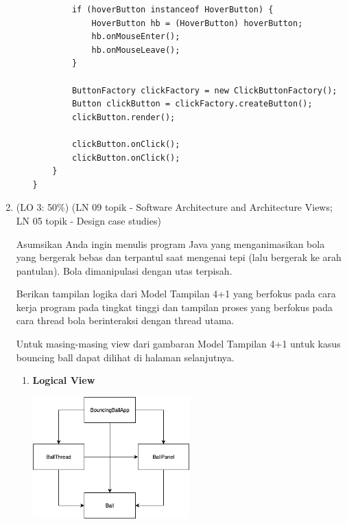 \documentclass[a4paper]{article}
\begin{document}
\begin{enumerate}[itemsep=1em]
\begin{enumerate}[itemsep=1em]
\begin{verbatim}
        if (hoverButton instanceof HoverButton) {
            HoverButton hb = (HoverButton) hoverButton;
            hb.onMouseEnter();
            hb.onMouseLeave();
        }
        
        ButtonFactory clickFactory = new ClickButtonFactory();
        Button clickButton = clickFactory.createButton();
        clickButton.render();
        
        clickButton.onClick();
        clickButton.onClick();
    }
}
    \end{verbatim}
  \end{enumerate}

  \item (LO 3: 50\%) (LN 09 topik - Software Architecture and Architecture Views; LN 05 topik - Design case studies)
  
  Asumsikan Anda ingin menulis program Java yang menganimasikan bola yang bergerak bebas dan terpantul saat mengenai tepi (lalu bergerak ke arah pantulan). Bola dimanipulasi dengan utas terpisah.

  \vspace{1em}

  Berikan tampilan logika dari Model Tampilan 4+1 yang berfokus pada cara kerja program pada tingkat tinggi dan tampilan proses yang berfokus pada cara thread bola berinteraksi dengan thread utama.

  \vspace{1em}

  Untuk masing-masing view dari gambaran Model Tampilan 4+1 untuk kasus bouncing ball dapat dilihat di halaman selanjutnya.

  \begin{enumerate}[itemsep=1em]
    \item \textbf{Logical View}
    
    \begin{center}
      \includegraphics[width=0.5\textwidth,keepaspectratio]{bouncing-ball-logical-view.png}
    \end{center}
    

\end{enumerate}
\end{enumerate}
\end{document}
